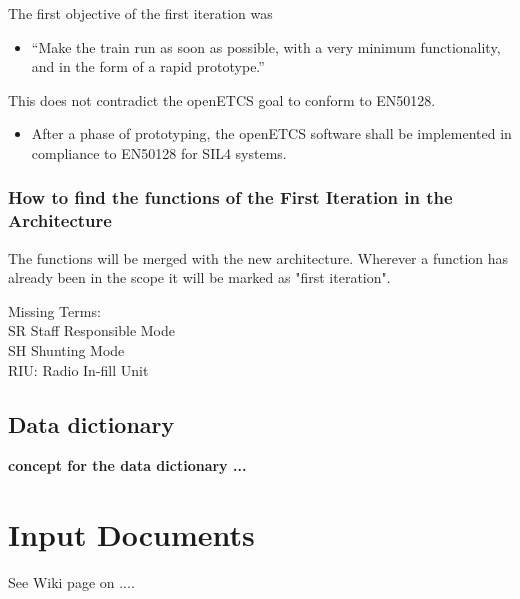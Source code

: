 \documentclass{template/openetcs_report}
\begin{document}
The first objective of the first iteration was
\begin{itemize}
	\item ``Make the train run as soon as possible, with a very minimum functionality, and in the form of a rapid prototype.''
\end{itemize}
This does not contradict the openETCS goal to conform to EN50128.
\begin{itemize}
	\item After a phase of prototyping, the openETCS software shall be implemented in compliance to EN50128 for SIL4 systems.
\end{itemize}

\subsection{How to find the functions of the First Iteration in the Architecture}
The functions will be merged with the new architecture. Wherever a function has already been in the scope it will be marked as "first iteration".




\glsaddall
\printglossaries

Missing Terms:\\
SR Staff Responsible Mode\\
SH Shunting Mode\\
RIU: Radio In-fill Unit\\

\section{Data dictionary}
\textbf{concept for the data dictionary ...}\\

\chapter{Input Documents}
See Wiki page on ....
\end{document}
